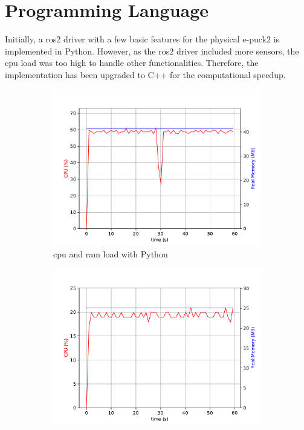 
\section{Programming Language}
Initially, a \ac{ros2} driver with a few basic features for the physical e-puck2 is implemented in Python.
However, as the \ac{ros2} driver included more sensors, the \ac{cpu} load was too high to handle other functionalities. Therefore, the implementation has been upgraded to C++ for the computational speedup.

\begin{figure}[H]
\centering
\begin{subfigure}{.8\textwidth}
  \centering
  \includegraphics[width=\linewidth]{physical/figures/rpi_py_32ms}
  \caption{\ac{cpu} and \ac{ram} load with Python}
  \label{fig:physical:py_vs_cpp:py}
\end{subfigure}
\begin{subfigure}{.8\textwidth}
  \centering
  \includegraphics[width=\linewidth]{physical/figures/rpi_cpp_32ms}

\end{subfigure}
\end{figure}
